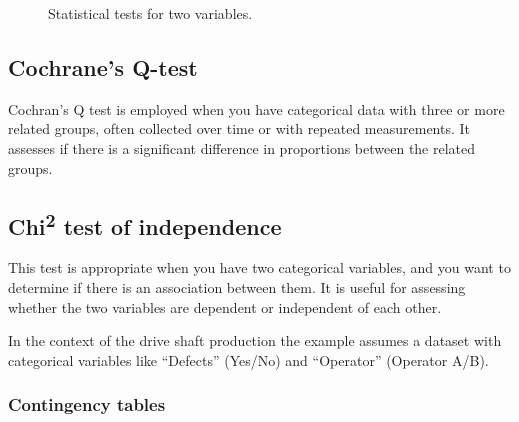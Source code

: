 \documentclass[
  a4paper,
]{scrbook}
\begin{document}
\begin{figure}[H]


\caption{\label{fig-tests-TwoVar-same}Statistical tests for two
variables.}

\end{figure}%

\subsection{Cochrane's Q-test}\label{cochranes-q-test}

Cochran's Q test is employed when you have categorical data with three
or more related groups, often collected over time or with repeated
measurements. It assesses if there is a significant difference in
proportions between the related groups.

\subsection{\texorpdfstring{Chi\textsuperscript{2} test of
independence}{Chi2 test of independence}}\label{chi2-test-of-independence}

This test is appropriate when you have two categorical variables, and
you want to determine if there is an association between them. It is
useful for assessing whether the two variables are dependent or
independent of each other.

In the context of the drive shaft production the example assumes a
dataset with categorical variables like ``Defects'' (Yes/No) and
``Operator'' (Operator A/B).

\subsubsection{Contingency tables}\label{contingency-tables}
\end{document}

